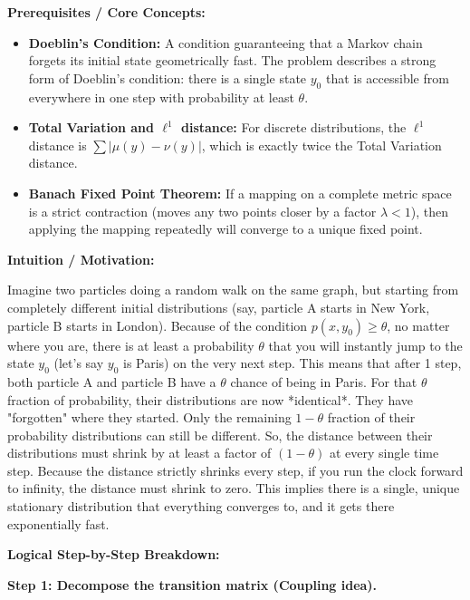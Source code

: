 \begin{solution}
\textbf{Prerequisites / Core Concepts:}
\begin{itemize}
    \item \textbf{Doeblin's Condition:} A condition guaranteeing that a Markov chain forgets its initial state geometrically fast. The problem describes a strong form of Doeblin's condition: there is a single state $y_0$ that is accessible from everywhere in one step with probability at least $\theta$.
    \item \textbf{Total Variation and $\ell^1$ distance:} For discrete distributions, the $\ell^1$ distance is $\sum | \mu(y) - \nu(y) |$, which is exactly twice the Total Variation distance.
    \item \textbf{Banach Fixed Point Theorem:} If a mapping on a complete metric space is a strict contraction (moves any two points closer by a factor $\lambda < 1$), then applying the mapping repeatedly will converge to a unique fixed point.
\end{itemize}

\textbf{Intuition / Motivation:}

Imagine two particles doing a random walk on the same graph, but starting from completely different initial distributions (say, particle A starts in New York, particle B starts in London).
Because of the condition $p(x, y_0) \geq \theta$, no matter where you are, there is at least a probability $\theta$ that you will instantly jump to the state $y_0$ (let's say $y_0$ is Paris) on the very next step.
This means that after 1 step, both particle A and particle B have a $\theta$ chance of being in Paris. For that $\theta$ fraction of probability, their distributions are now *identical*. They have "forgotten" where they started.
Only the remaining $1-\theta$ fraction of their probability distributions can still be different. So, the distance between their distributions must shrink by at least a factor of $(1-\theta)$ at every single time step.
Because the distance strictly shrinks every step, if you run the clock forward to infinity, the distance must shrink to zero. This implies there is a single, unique stationary distribution that everything converges to, and it gets there exponentially fast.

\textbf{Logical Step-by-Step Breakdown:}

\textbf{Step 1: Decompose the transition matrix (Coupling idea).}


\end{solution}
